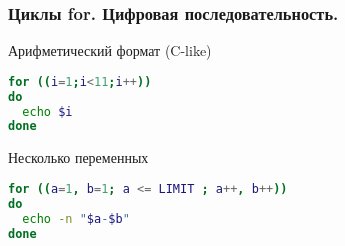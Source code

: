 \begin{frame}[fragile]
\frametitle{Циклы for. Цифровая последовательность.}
  \begin{block}{Арифметический формат (C-like) }
\begin{lstlisting}[language=bash,frame=single]
for ((i=1;i<11;i++))
do 
  echo $i
done  
\end{lstlisting}
  \end{block}

  \begin{block}{Несколько переменных}
    \begin{lstlisting}[language=sh,frame=single]
for ((a=1, b=1; a <= LIMIT ; a++, b++))
do
  echo -n "$a-$b"
done
    \end{lstlisting}
  \end{block}
\end{frame}
